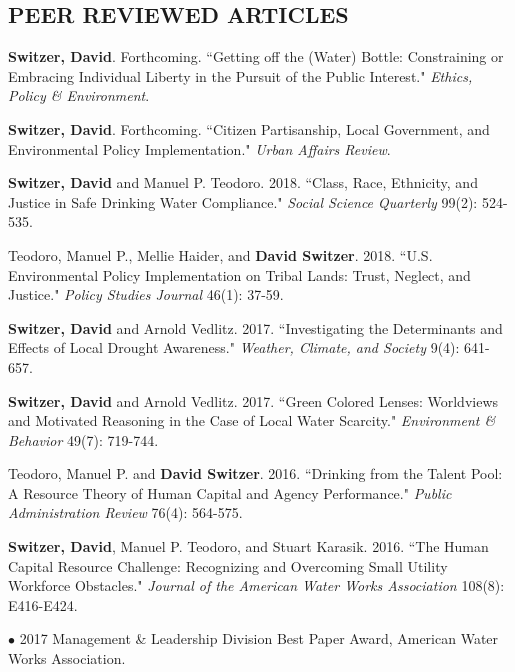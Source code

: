 \documentclass[margin]{res} %
\begin{document}
\begin{resume}


 \section{PEER REVIEWED ARTICLES}

 \begin{hangparas}{.25in}{1} \textbf{Switzer, David}. Forthcoming. ``Getting off the (Water) Bottle: Constraining or Embracing Individual Liberty in the Pursuit of the Public Interest." \textit{Ethics, Policy \& Environment}.
 
 \textbf{Switzer, David}. Forthcoming. ``Citizen Partisanship, Local Government, and Environmental Policy Implementation." \textit{Urban Affairs Review}.
 
\textbf{Switzer, David} and Manuel P. Teodoro. 2018. ``Class, Race, Ethnicity, and Justice in Safe Drinking Water Compliance." \textit{Social Science Quarterly} 99(2): 524-535.

 Teodoro, Manuel P., Mellie Haider, and \textbf{David Switzer}. 2018. ``U.S. Environmental Policy Implementation on Tribal Lands: Trust, Neglect, and Justice." \textit{Policy Studies Journal} 46(1): 37-59.

\textbf{Switzer, David} and Arnold Vedlitz. 2017. ``Investigating the Determinants and Effects of Local Drought Awareness." \textit{Weather, Climate, and Society} 9(4): 641-657.

\textbf{Switzer, David} and Arnold Vedlitz. 2017. ``Green Colored Lenses: Worldviews and Motivated Reasoning in the Case of Local Water Scarcity." \textit{Environment \& Behavior} 49(7): 719-744.

Teodoro, Manuel P. and \textbf{David Switzer}. 2016. ``Drinking from the Talent Pool: A Resource Theory of Human Capital and Agency Performance." \textit{Public Administration Review} 76(4): 564-575.

\textbf{Switzer, David}, Manuel P. Teodoro, and Stuart Karasik. 2016. ``The Human Capital Resource Challenge: Recognizing and Overcoming Small Utility Workforce Obstacles." \textit{Journal of the American Water Works Association} 108(8): E416-E424.

\hspace{.25in}$\bullet$ 2017 Management \& Leadership Division Best Paper Award, American Water Works Association.


\end{hangparas}
\end{resume}
\end{document}

